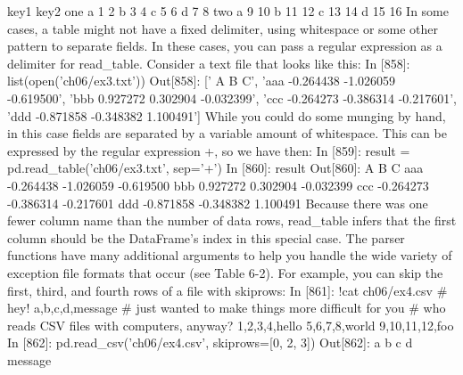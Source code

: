 key1 key2
one a 1 2
b 3 4
c 5 6
d 7 8
two a 9 10
b 11 12
c 13 14
d 15 16
In some cases, a table might not have a fixed delimiter, using whitespace or some other
pattern to separate fields. In these cases, you can pass a regular expression as a delimiter
for read_table. Consider a text file that looks like this:
In [858]: list(open('ch06/ex3.txt'))
Out[858]:
[' A B C\n',
'aaa -0.264438 -1.026059 -0.619500\n',
'bbb 0.927272 0.302904 -0.032399\n',
'ccc -0.264273 -0.386314 -0.217601\n',
'ddd -0.871858 -0.348382 1.100491\n']
While you could do some munging by hand, in this case fields are separated by a variable
amount of whitespace. This can be expressed by the regular expression \s+, so we have
then:
In [859]: result = pd.read_table('ch06/ex3.txt', sep='\s+')
In [860]: result
Out[860]:
A B C
aaa -0.264438 -1.026059 -0.619500
bbb 0.927272 0.302904 -0.032399
ccc -0.264273 -0.386314 -0.217601
ddd -0.871858 -0.348382 1.100491
Because there was one fewer column name than the number of data rows, read_table
infers that the first column should be the DataFrame’s index in this special case.
The parser functions have many additional arguments to help you handle the wide
variety of exception file formats that occur (see Table 6-2). For example, you can skip
the first, third, and fourth rows of a file with skiprows:
In [861]: !cat ch06/ex4.csv
# hey!
a,b,c,d,message
# just wanted to make things more difficult for you
# who reads CSV files with computers, anyway?
1,2,3,4,hello
5,6,7,8,world
9,10,11,12,foo
In [862]: pd.read_csv('ch06/ex4.csv', skiprows=[0, 2, 3])
Out[862]:
a b c d message
